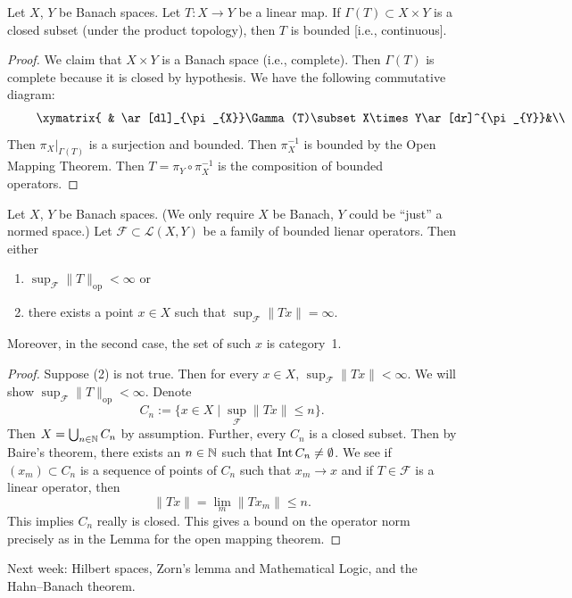 \begin{theorem}
Let $X$, $Y$ be Banach spaces.
Let $T\colon X\to Y$ be a linear map. If $\Gamma(T)\subset X\times Y$
is a closed subset (under the product topology), then $T$ is bounded
[i.e., continuous].
\end{theorem}

\begin{proof}
We claim that $X\times Y$ is a Banach space (i.e., complete).
Then $\Gamma(T)$ is complete because it is closed by hypothesis.
We have the following commutative diagram:
\begin{equation}
\vcenter{\xymatrix{ & \ar[dl]_{\pi_{X}}\Gamma(T)\subset X\times Y\ar[dr]^{\pi_{Y}}&\\
X\ar[rr]^{T} & & Y}}
\end{equation}
Then $\pi_{X}|_{\Gamma(T)}$ is a surjection and bounded. Then
$\pi_{X}^{-1}$ is bounded by the Open Mapping Theorem. Then
$T=\pi_{Y}\circ\pi_{X}^{-1}$ is the composition of bounded operators.
\end{proof}

\begin{theorem}
Let $X$, $Y$ be Banach spaces. (We only require $X$ be Banach, $Y$
could be ``just'' a normed space.) Let
$\mathcal{F}\subset\mathcal{L}(X,Y)$ be a family of bounded lienar
operators. Then either
\begin{enumerate}
\item $\sup_{\mathcal{F}}\|T\|_{\text{op}}<\infty$ or
\item there exists a point $x\in X$ such that $\sup_{\mathcal{F}}\|Tx\|=\infty$.
\end{enumerate}
Moreover, in the second case, the set of such $x$ is category~1.
\end{theorem}

\begin{proof}
Suppose (2) is not true.
Then for every $x\in X$, $\sup_{\mathcal{F}}\|Tx\|<\infty$. We will show
$\sup_{\mathcal{F}}\|T\|_{\text{op}}<\infty$. Denote
\begin{equation}
C_{n} := \{x\in X\mid\sup_{\mathcal{F}}\|Tx\|\leq n\}.
\end{equation}
Then $X=\bigcup_{n\in\mathbb{N}}C_{n}$ by assumption. Further, every $C_{n}$
is a closed subset.
Then by Baire's theorem, there exists an $n\in\mathbb{N}$ such that
$\operatorname{Int}{C_{n}}\neq\emptyset$. We see if $(x_{m})\subset C_{n}$ is a
sequence of points of $C_{n}$ such that $x_{m}\to x$ and if
$T\in\mathcal{F}$ is a linear operator, then
\begin{equation}
\|Tx\|=\lim_{m}\|Tx_{m}\|\leq n.
\end{equation}
This implies $C_{n}$ really is closed. This gives a bound on the
operator norm precisely as in the Lemma for the open mapping theorem.
\end{proof}

Next week: Hilbert spaces, Zorn's lemma and Mathematical Logic, and
the Hahn--Banach theorem.

